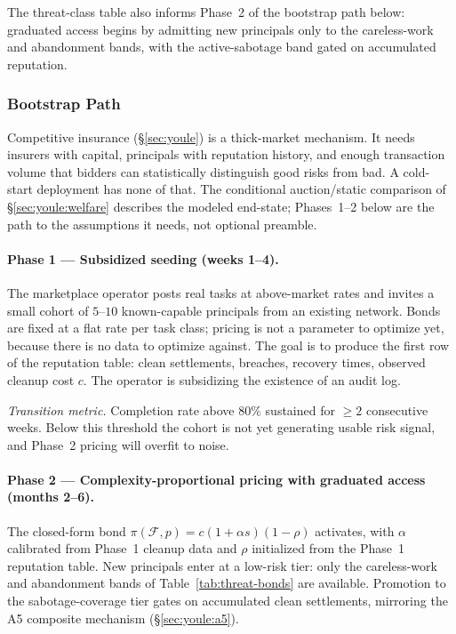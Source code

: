 \documentclass[11pt,a4paper]{article}
\theoremstyle{definition}
\theoremstyle{remark}
\begin{document}
The threat-class table also informs Phase~2 of the bootstrap path below: graduated access begins by admitting new principals only to the careless-work and abandonment bands, with the active-sabotage band gated on accumulated reputation.

\subsubsection{Bootstrap Path}\label{sec:pricing:bootstrap}

Competitive insurance (\S\ref{sec:youle}) is a thick-market mechanism. It needs insurers with capital, principals with reputation history, and enough transaction volume that bidders can statistically distinguish good risks from bad. A cold-start deployment has none of that. The conditional auction/static comparison of \S\ref{sec:youle:welfare} describes the modeled end-state; Phases~1--2 below are the path to the assumptions it needs, not optional preamble.

\paragraph{Phase 1 --- Subsidized seeding (weeks 1--4).}
The marketplace operator posts real tasks at above-market rates and invites a small cohort of $5$--$10$ known-capable principals from an existing network. Bonds are fixed at a flat rate per task class; pricing is not a parameter to optimize yet, because there is no data to optimize against. The goal is to produce the first row of the reputation table: clean settlements, breaches, recovery times, observed cleanup cost $c$. The operator is subsidizing the existence of an audit log.

\emph{Transition metric.} Completion rate above $80\%$ sustained for $\geq 2$ consecutive weeks. Below this threshold the cohort is not yet generating usable risk signal, and Phase~2 pricing will overfit to noise.

\paragraph{Phase 2 --- Complexity-proportional pricing with graduated access (months 2--6).}
The closed-form bond $\pi(\mathcal{F}, p) = c(1 + \alpha s)(1 - \rho)$ activates, with $\alpha$ calibrated from Phase~1 cleanup data and $\rho$ initialized from the Phase~1 reputation table. New principals enter at a low-risk tier: only the careless-work and abandonment bands of Table~\ref{tab:threat-bonds} are available. Promotion to the sabotage-coverage tier gates on accumulated clean settlements, mirroring the A5 composite mechanism (\S\ref{sec:youle:a5}).
\end{document}
